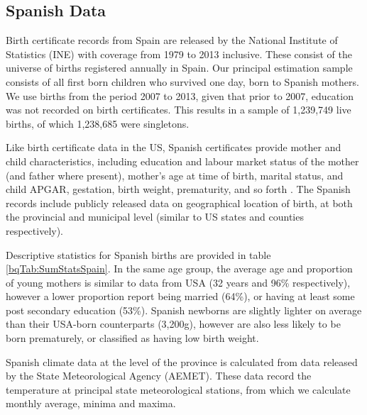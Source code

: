 \documentclass[a4paper, 12 pt]{article}
\theoremstyle{plain}
\begin{document}
\begin{doublespace}
\subsection{Spanish Data}

Birth certificate records from Spain are released by the National Institute of Statistics (INE)
with coverage from 1979 to 2013 inclusive. These consist of the universe of
births registered annually in Spain. Our principal estimation sample consists of
all first born children who survived one day, born to Spanish mothers. We use
births from the period 2007 to 2013, given that prior to 2007, education was not
recorded on birth certificates.  This results in a sample of 1,239,749 live
births, of which 1,238,685 were singletons.

Like birth certificate data in the US, Spanish certificates provide mother
and child characteristics, including education and labour market status of the
mother (and father where present), mother's age at time of birth, marital
status, and child APGAR, gestation, birth weight, prematurity, and so forth
\citep{INE2013}.  The Spanish records include publicly released data on
geographical location of birth, at both the provincial and municipal level
(similar to US states and counties respectively).

Descriptive statistics for Spanish births are provided in table \ref{bqTab:SumStatsSpain}.  In the same
age group, the average age and proportion of young mothers is similar to data
from USA (32 years and 96\% respectively), however a lower proportion report
being married (64\%), or having at least some post secondary education (53\%).
Spanish newborns are slightly lighter on average than their USA-born
counterparts (3,200g), however are also less likely to be born prematurely,
or classified as having low birth weight.

Spanish climate data at the level of the province is calculated from data released by the State Meteorological
Agency (AEMET). These data record the temperature at principal state
meteorological stations, from which we calculate monthly average, minima and
maxima.

\end{doublespace}
\end{document}
